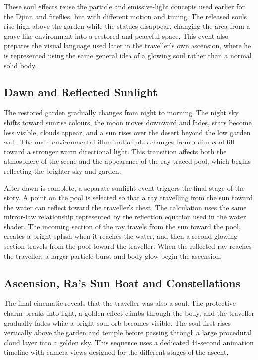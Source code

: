 \documentclass[11pt,a4paper]{article}
\begin{document}
These soul effects reuse the particle and emissive-light concepts used earlier
for the Djinn and fireflies, but with different motion and timing. The released
souls rise high above the garden while the statues disappear, changing the area
from a grave-like environment into a restored and peaceful space. This event
also prepares the visual language used later in the traveller's own ascension,
where he is represented using the same general idea of a glowing soul rather
than a normal solid body.

\subsection{Dawn and Reflected Sunlight}

The restored garden gradually changes from night to morning. The night sky
shifts toward sunrise colours, the moon moves downward and fades, stars become
less visible, clouds appear, and a sun rises over the desert beyond the low
garden wall. The main environmental illumination also changes from a dim cool
fill toward a stronger warm directional light. This transition affects both
the atmosphere of the scene and the appearance of the ray-traced pool, which
begins reflecting the brighter sky and garden.

After dawn is complete, a separate sunlight event triggers the final stage of
the story. A point on the pool is selected so that a ray travelling from the
sun toward the water can reflect toward the traveller's chest. The calculation
uses the same mirror-law relationship represented by the reflection equation
used in the water shader. The incoming section of the ray travels from the sun
toward the pool, creates a bright splash when it reaches the water, and then a
second glowing section travels from the pool toward the traveller. When the
reflected ray reaches the traveller, a larger particle burst and body glow begin
the ascension.

\subsection{Ascension, Ra's Sun Boat and Constellations}

The final cinematic reveals that the traveller was also a soul. The protective
charm breaks into light, a golden effect climbs through the body, and the
traveller gradually fades while a bright soul orb becomes visible. The soul
first rises vertically above the garden and temple before passing through a
large procedural cloud layer into a golden sky. This sequence uses a dedicated
44-second animation timeline with camera views designed for the different
stages of the ascent.
\end{document}
